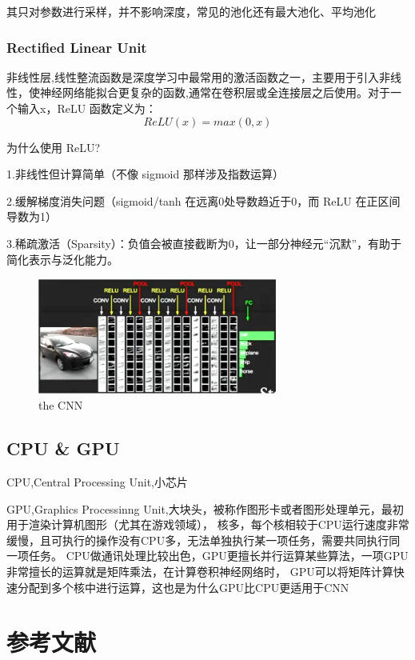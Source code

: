 \documentclass[12pt]{article}
\begin{document}
其只对参数进行采样，并不影响深度，常见的池化还有最大池化、平均池化

\subsubsection{Rectified Linear Unit}
非线性层,线性整流函数是深度学习中最常用的激活函数之一，主要用于引入非线性，使神经网络能拟合更复杂的函数,通常在卷积层或全连接层之后使用。对于一个输入x，ReLU 函数定义为：
\\$$ReLU(x)=max(0,x)$$

为什么使用 ReLU?

1.非线性但计算简单（不像 sigmoid 那样涉及指数运算）

2.缓解梯度消失问题（sigmoid/tanh 在远离0处导数趋近于0，而 ReLU 在正区间导数为1）

3.稀疏激活（Sparsity）：负值会被直接截断为0，让一部分神经元“沉默”，有助于简化表示与泛化能力。
\begin{figure}[ht]  %
\centering
\includegraphics[width=0.7\textwidth]{pic13.png}
\caption{the CNN}
\end{figure}

\subsection{CPU \& GPU}
CPU,Central Processing Unit,小芯片

GPU,Graphics Processinng Unit,大块头，被称作图形卡或者图形处理单元，最初用于渲染计算机图形（尤其在游戏领域），
核多，每个核相较于CPU运行速度非常缓慢，且可执行的操作没有CPU多，无法单独执行某一项任务，需要共同执行同一项任务。
CPU做通讯处理比较出色，GPU更擅长并行运算某些算法，一项GPU非常擅长的运算就是矩阵乘法，在计算卷积神经网络时，
GPU可以将矩阵计算快速分配到多个核中进行运算，这也是为什么GPU比CPU更适用于CNN


\section*{参考文献}


\end{document}
